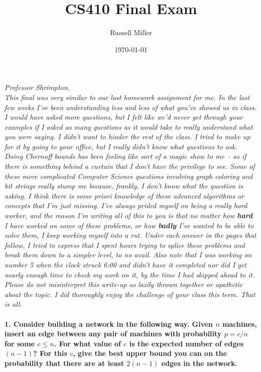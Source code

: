 \documentclass{article}
\title{CS410 Final Exam}
\author{Russell Miller}
\date{\today}
\begin{document}
\maketitle

\emph{Professor Shrimpton,\\
This final was very similar to our last homework assignment for me. In the last 
few
weeks I've been understanding less and less of what you've showed us in class.
I would have asked more questions, but I felt like we'd never get through your
examples if I asked as many questions as it would take to really understand
what you were saying. I didn't want to hinder the rest of the class. I tried
to make up for it by going to your office, but I really didn't know what 
questions to ask. Doing Chernoff bounds has been feeling like sort of a magic
show to me -- as if there is something behind a curtain that I don't have the
privilege to see. Some of these more complicated Computer Science questions
involving graph coloring and bit strings really stump me because, frankly,
I don't know what the question is asking. I think there is some priori
knowledge of these advanced algorithms or concepts that I'm just missing.
I've always prided myself on being a really hard worker, and the reason I'm
writing all of this to you is that no matter how \textbf{hard} I have worked
on some of these problems, or how \textbf{badly} I've wanted to be able to
solve them, I keep working myself into a rut. Under each answer in the pages 
that follow, 
I tried to express that I spent
hours trying to splice these problems and break them down to a simpler level,
to no avail. Also note that I was working on number 5 when the clock struck 
6:00 and didn't have it completed nor did I get nearly enough time to check
my work on it, by the time I had skipped ahead to it.
Please do not misinterpret this write-up as lazily thrown together
or apathetic about the topic. I did thoroughly enjoy the challenge of your
class this term. That is all.}

\pagebreak

\paragraph{1. Consider building a network in the following way. Given $n$ 
machines, insert an edge between any pair of machines with probability $p = 
c/n$ for some $c \leq n$. For what value of $c$ is the expected number of edges 
$(n - 1)$? For this $c$, give the best upper bound you can on the probability 
that there are at least $2(n - 1)$ edges in the network.\\\\}
\end{document}
